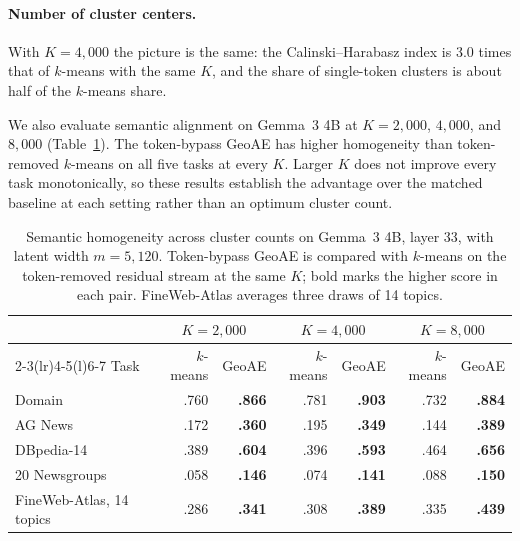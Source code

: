 \documentclass[11pt]{article}
\begin{document}
\paragraph{Number of cluster centers.}
With $K = 4{,}000$ the picture is the same: the Calinski--Harabasz index is 3.0 times that of $k$-means with the same $K$, and the share of single-token clusters is about half of the $k$-means share.

We also evaluate semantic alignment on Gemma~3 4B at $K = 2{,}000$, $4{,}000$, and $8{,}000$ (Table~\ref{tab:gemma-k-sweep}).
The token-bypass GeoAE has higher homogeneity than token-removed $k$-means on all five tasks at every $K$.
Larger $K$ does not improve every task monotonically, so these results establish the advantage over the matched baseline at each setting rather than an optimum cluster count.

\begin{table}[t]
\centering
\small
\setlength{\tabcolsep}{6pt}
\begin{tabular}{@{}l rr rr rr@{}}
\toprule
 & \multicolumn{2}{c}{$K = 2{,}000$} & \multicolumn{2}{c}{$K = 4{,}000$} & \multicolumn{2}{c}{$K = 8{,}000$} \\
\cmidrule(lr){2-3}\cmidrule(lr){4-5}\cmidrule(l){6-7}
Task & $k$-means & GeoAE & $k$-means & GeoAE & $k$-means & GeoAE \\
\midrule
Domain & .760 & \textbf{.866} & .781 & \textbf{.903} & .732 & \textbf{.884} \\
AG News & .172 & \textbf{.360} & .195 & \textbf{.349} & .144 & \textbf{.389} \\
DBpedia-14 & .389 & \textbf{.604} & .396 & \textbf{.593} & .464 & \textbf{.656} \\
20 Newsgroups & .058 & \textbf{.146} & .074 & \textbf{.141} & .088 & \textbf{.150} \\
FineWeb-Atlas, 14 topics & .286 & \textbf{.341} & .308 & \textbf{.389} & .335 & \textbf{.439} \\
\bottomrule
\end{tabular}
\caption{Semantic homogeneity across cluster counts on Gemma~3 4B, layer 33, with latent width $m=5{,}120$. Token-bypass GeoAE is compared with $k$-means on the token-removed residual stream at the same $K$; bold marks the higher score in each pair. FineWeb-Atlas averages three draws of 14 topics.}
\label{tab:gemma-k-sweep}
\end{table}
\end{document}
